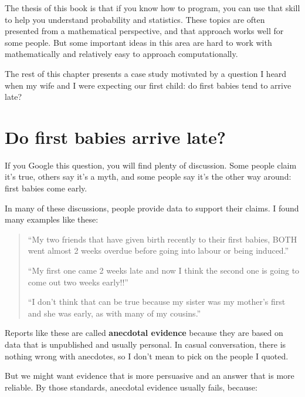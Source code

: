 \documentclass[12pt]{book}
\begin{document}
The thesis of this book is that if you know how to program, you can
use that skill to help you understand probability and statistics.
These topics are often presented from a mathematical perspective, and
that approach works well for some people.  But some important ideas
in this area are hard to work with mathematically and relatively
easy to approach computationally.

The rest of this chapter presents a case study motivated by a question
I heard when my wife and I were expecting our first child: do first
babies tend to arrive late?

\section{Do first babies arrive late?}

If you Google this question, you will find plenty of discussion.
Some people claim it's true, others say it's a myth, and some people
say it's the other way around: first babies come early.

In many of these discussions, people provide data to support their
claims.  I found many examples like these:

\begin{quote}

``My two friends that have given birth recently to their first babies,
BOTH went almost 2 weeks overdue before going into labour or being
induced.''

``My first one came 2 weeks late and now I think the second one is
going to come out two weeks early!!''

``I don't think that can be true because my sister was my mother's
first and she was early, as with many of my cousins.''

\end{quote}

Reports like these are called {\bf anecdotal evidence} because they
are based on data that is unpublished and usually personal.  In casual
conversation, there is nothing wrong with anecdotes, so I don't mean
to pick on the people I quoted.

But we might want evidence that is more persuasive and
an answer that is more reliable.  By those standards, anecdotal
evidence usually fails, because:
\end{document}
